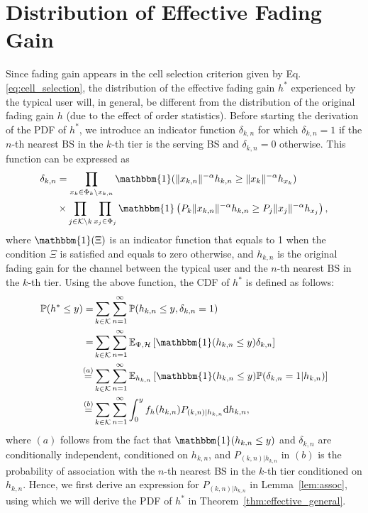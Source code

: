 \documentclass[final]{IEEEtran}
\begin{document}
\section{Distribution of Effective Fading Gain}
Since fading gain appears in the cell selection criterion given by Eq. \ref{eq:cell_selection}, the distribution of the effective fading gain $h^*$ experienced by the typical user will, in general, be different from the distribution of the original fading gain $h$ (due to the effect of order statistics). Before starting the derivation of the PDF of $h^*$, we introduce an indicator function $\delta_{k,n}$ for which $\delta_{k,n}=1$ if the $n$-th nearest BS in the $k$-th tier is the serving BS and $\delta_{k,n}=0$ otherwise. This function can be expressed as
\begin{align}
\label{Eq:2}
\delta_{k,n}&=\prod_{x_k\in\Phi_k\backslash x_{k,n}}\mathbbm{1}(\|x_{k,n}\|^{-\alpha}h_{k,n}\geq\|x_k\|^{-\alpha}h_{x_k})\\ &\times\prod_{j\in\mathcal{K}\backslash k}\prod_{x_j\in\Phi_j}\mathbbm{1}\left(P_k\|x_{k,n}\|^{-\alpha}h_{k,n}\geq P_j\|x_j\|^{-\alpha}h_{x_j}\right),\nonumber
\end{align}
where $\mathbbm{1}(\Xi)$ is an indicator function that equals to 1 when the condition $\Xi$ is satisfied and equals to zero otherwise, and $h_{k,n}$ is the original fading gain for the channel between the typical user and the $n$-th nearest BS in the $k$-th tier. Using the above function, the CDF of $h^*$ is defined as follows:
\begin{align}
\label{Eq_pre_lemma_1}
\mathbb{P}(h^*\leq y)=&\sum_{k\in\mathcal{K}}\sum_{n=1}^{\infty}\mathbb{P}(h_{k,n}\leq y,\delta_{k,n}=1)\nonumber\\
=&\sum_{k\in\mathcal{K}}\sum_{n=1}^{\infty}\mathbb{E}_{\Psi,\mathcal{H}}\left[\mathbbm{1}(h_{k,n}\leq y)\delta_{k,n}\right]\nonumber\\
\stackrel{(a)}{=}&\sum_{k\in\mathcal{K}}\sum_{n=1}^{\infty}\mathbb{E}_{h_{k,n}}\left[\mathbbm{1}(h_{k,n}\leq y)\mathbb{P}(\delta_{k,n}=1|h_{k,n})\right]\nonumber\\
\stackrel{(b)}{=}&\sum_{k\in\mathcal{K}}\sum_{n=1}^{\infty}\int_0^{y}f_h(h_{k,n})P_{(k,n)|h_{k,n}}{\rm d}h_{k,n},
\end{align}
where $(a)$ follows from the fact that $\mathbbm{1}(h_{k,n}\leq y)$ and $\delta_{k,n}$ are conditionally independent, conditioned on $h_{k,n}$, and $P_{(k,n)|h_{k,n}}$ in $(b)$ is the probability of association with the $n$-th nearest BS in the $k$-th tier conditioned on $h_{k,n}$. Hence, we first derive an expression for $P_{(k,n)|h_{k,n}}$ in Lemma~\ref{lem:assoc}, using which we will derive the PDF of $h^*$ in Theorem~\ref{thm:effective_general}.
\end{document}
